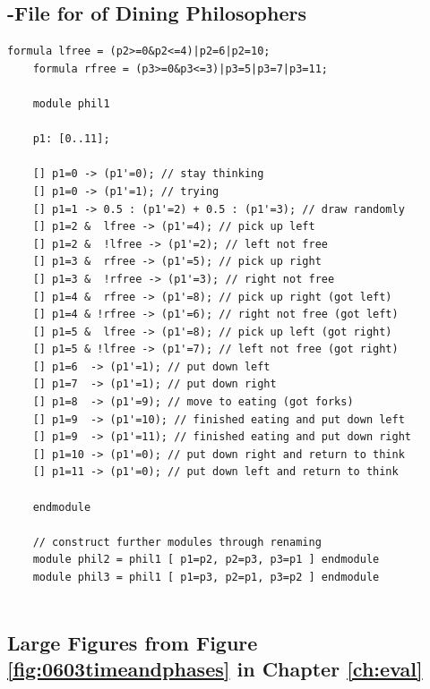 \documentclass[preview]{standalone}
\begin{document}
\subsection[\prism-File Dining Philosophers]{\prism-File for \mdpN of Dining Philosophers} \label{lst:0601diningphilosophersfull}
\begin{lstlisting}[language=prism, caption={PRISM model file for \mdpN of Dining Philosophers}]
	formula lfree = (p2>=0&p2<=4)|p2=6|p2=10;
	formula rfree = (p3>=0&p3<=3)|p3=5|p3=7|p3=11;
	
	module phil1
	
	p1: [0..11];
	
	[] p1=0 -> (p1'=0); // stay thinking
	[] p1=0 -> (p1'=1); // trying
	[] p1=1 -> 0.5 : (p1'=2) + 0.5 : (p1'=3); // draw randomly
	[] p1=2 &  lfree -> (p1'=4); // pick up left
	[] p1=2 &  !lfree -> (p1'=2); // left not free
	[] p1=3 &  rfree -> (p1'=5); // pick up right
	[] p1=3 &  !rfree -> (p1'=3); // right not free
	[] p1=4 &  rfree -> (p1'=8); // pick up right (got left)
	[] p1=4 & !rfree -> (p1'=6); // right not free (got left)
	[] p1=5 &  lfree -> (p1'=8); // pick up left (got right)
	[] p1=5 & !lfree -> (p1'=7); // left not free (got right)
	[] p1=6  -> (p1'=1); // put down left
	[] p1=7  -> (p1'=1); // put down right
	[] p1=8  -> (p1'=9); // move to eating (got forks)
	[] p1=9  -> (p1'=10); // finished eating and put down left 
	[] p1=9  -> (p1'=11); // finished eating and put down right
	[] p1=10 -> (p1'=0); // put down right and return to think
	[] p1=11 -> (p1'=0); // put down left and return to think
	
	endmodule
	
	// construct further modules through renaming
	module phil2 = phil1 [ p1=p2, p2=p3, p3=p1 ] endmodule
	module phil3 = phil1 [ p1=p3, p2=p1, p3=p2 ] endmodule	
			
\end{lstlisting}
	
\pagebreak

\subsection[Figures Large]{Large Figures from Figure \ref{fig:0603timeandphases} in Chapter \ref{ch:eval}}
\end{document}

